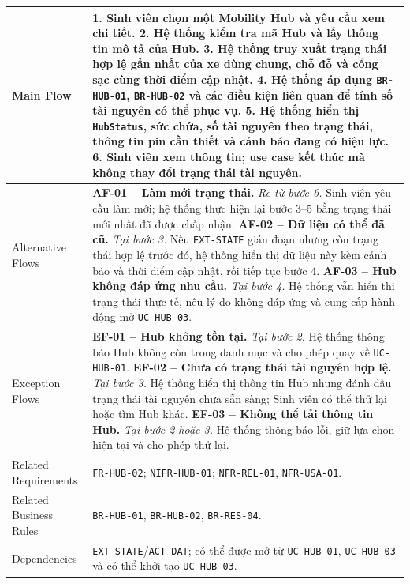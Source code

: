 \begin{longtable}{|L{42mm}|L{102mm}|}
  Main Flow &
    \textbf{1.} Sinh viên chọn một Mobility Hub và yêu cầu xem chi tiết.\newline
    \textbf{2.} Hệ thống kiểm tra mã Hub và lấy thông tin mô tả của Hub.\newline
    \textbf{3.} Hệ thống truy xuất trạng thái hợp lệ gần nhất của xe dùng chung, chỗ đỗ và cổng sạc cùng thời điểm cập nhật.\newline
    \textbf{4.} Hệ thống áp dụng \texttt{BR-HUB-01}, \texttt{BR-HUB-02} và các điều kiện liên quan để tính số tài nguyên có thể phục vụ.\newline
    \textbf{5.} Hệ thống hiển thị \texttt{HubStatus}, sức chứa, số tài nguyên theo trạng thái, thông tin pin cần thiết và cảnh báo đang có hiệu lực.\newline
    \textbf{6.} Sinh viên xem thông tin; use case kết thúc mà không thay đổi trạng thái tài nguyên.\\\hline
  Alternative Flows &
    \textbf{AF-01 -- Làm mới trạng thái.} \textit{Rẽ từ bước 6.} Sinh viên yêu cầu làm mới; hệ thống thực hiện lại bước 3--5 bằng trạng thái mới nhất đã được chấp nhận.\newline
    \textbf{AF-02 -- Dữ liệu có thể đã cũ.} \textit{Tại bước 3.} Nếu \texttt{EXT-STATE} gián đoạn nhưng còn trạng thái hợp lệ trước đó, hệ thống hiển thị dữ liệu này kèm cảnh báo và thời điểm cập nhật, rồi tiếp tục bước 4.\newline
    \textbf{AF-03 -- Hub không đáp ứng nhu cầu.} \textit{Tại bước 4.} Hệ thống vẫn hiển thị trạng thái thực tế, nêu lý do không đáp ứng và cung cấp hành động mở \texttt{UC-HUB-03}.\\\hline
  Exception Flows &
    \textbf{EF-01 -- Hub không tồn tại.} \textit{Tại bước 2.} Hệ thống thông báo Hub không còn trong danh mục và cho phép quay về \texttt{UC-HUB-01}.\newline
    \textbf{EF-02 -- Chưa có trạng thái tài nguyên hợp lệ.} \textit{Tại bước 3.} Hệ thống hiển thị thông tin Hub nhưng đánh dấu trạng thái tài nguyên chưa sẵn sàng; Sinh viên có thể thử lại hoặc tìm Hub khác.\newline
    \textbf{EF-03 -- Không thể tải thông tin Hub.} \textit{Tại bước 2 hoặc 3.} Hệ thống thông báo lỗi, giữ lựa chọn hiện tại và cho phép thử lại.\\\hline
  Related Requirements & \texttt{FR-HUB-02}; \texttt{NIFR-HUB-01}; \texttt{NFR-REL-01}, \texttt{NFR-USA-01}.\\\hline
  Related Business Rules & \texttt{BR-HUB-01}, \texttt{BR-HUB-02}, \texttt{BR-RES-04}.\\\hline
  Dependencies & \texttt{EXT-STATE}/\texttt{ACT-DAT}; có thể được mở từ \texttt{UC-HUB-01}, \texttt{UC-HUB-03} và có thể khởi tạo \texttt{UC-HUB-03}.\\\hline
\end{longtable}
\normalsize

